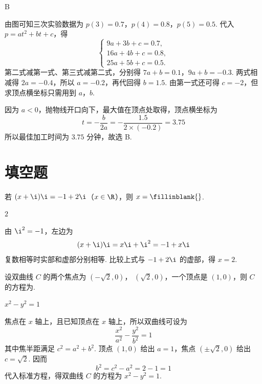 \begin{answer}
B
\end{answer}

\begin{solution}
由图可知三次实验数据为 \(p(3)=0.7\)，\(p(4)=0.8\)，\(p(5)=0.5\). 代入 \(p=at^2+bt+c\)，得
\[
\begin{cases}
9a+3b+c=0.7,\\
16a+4b+c=0.8,\\
25a+5b+c=0.5.
\end{cases}
\]
第二式减第一式、第三式减第二式，分别得
\(7a+b=0.1\)，\(9a+b=-0.3\).
两式相减得 \(2a=-0.4\)，所以 \(a=-0.2\)，再代回得 \(b=1.5\). 由第一式还可得 \(c=-2\)，但求顶点横坐标只需用到 \(a\)，\(b\).

因为 \(a<0\)，抛物线开口向下，最大值在顶点处取得，顶点横坐标为
\[
t=-\frac{b}{2a}=-\frac{1.5}{2\times(-0.2)}=3.75
\]
所以最佳加工时间为 \(3.75\) 分钟，故选 B.
\end{solution}

\section{填空题}

\begin{problem}
若 \( (x+\i)\i=-1+2\i \)（\(x\in\R\)），则 \(x=\fillinblank{}\).
\end{problem}

\begin{answer}
\(2\)
\end{answer}

\begin{solution}
由 \(\i^2=-1\)，左边为
\[
(x+\i)\i=x\i+\i^2=-1+x\i
\]
复数相等时实部和虚部分别相等. 比较上式与 \(-1+2\i\) 的虚部，得 \(x=2\).
\end{solution}

\begin{problem}
设双曲线 \(C\) 的两个焦点为 \( (- \sqrt{2}, 0) \)， \( (\sqrt{2}, 0) \)，一个顶点是 \( (1, 0) \)，则 \(C\) 的方程为\fillinblank{}.
\end{problem}

\begin{answer}
\(x^2-y^2=1\)
\end{answer}

\begin{solution}
焦点在 \(x\) 轴上，且已知顶点在 \(x\) 轴上，所以双曲线可设为
\[
\frac{x^2}{a^2}-\frac{y^2}{b^2}=1
\]
其中焦半距满足 \(c^2=a^2+b^2\). 顶点 \((1,0)\) 给出 \(a=1\)，焦点 \((\pm\sqrt{2},0)\) 给出 \(c=\sqrt{2}\). 因而
\[
b^2=c^2-a^2=2-1=1
\]
代入标准方程，得双曲线 \(C\) 的方程为 \(x^2-y^2=1\).
\end{solution}

